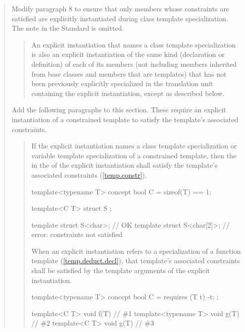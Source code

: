 \begin{quote}
Modify paragraph 8 to ensure that only members whose constraints are 
satisfied are explicitly instantiated during class template 
specialization. The note in the \Cpp Standard is omitted.

\begin{quote}
\setcounter{Paras}{7}
\pnum
An explicit instantiation that names a class template specialization is 
also an explicit instantiation of the same kind (declaration or 
definition) of each of its members (not including members inherited from 
base classes and members that are templates) that has not been previously 
explicitly specialized in the translation unit containing the explicit 
instantiation,  
except as described below.
\end{quote}

Add the following paragraphs to this section. These require an explicit
instantiation of a constrained template to satisfy the template's
associated constraints.

\begin{quote}
\begin{addedblock}
\setcounter{Paras}{13}
\pnum
If the explicit instantiation names a class template specialization
or variable template specialization of a constrained template, then
the  in the
 of the explicit
instantiation shall satisfy the template's associated constraints
(\ref{temp.constr}).
\enterexample
\begin{codeblock}
template<typename T> concept bool C = sizeof(T) == 1;

template<C T> struct S { };

template struct S<char>;    // OK
template struct S<char[2]>; // error: constraints not satisfied
\end{codeblock}
\exitexample

\pnum
When an explicit instantiation refers to a specialization of a
function template (\ref{temp.deduct.decl}), that 
template's associated constraints shall be satisfied by the template 
arguments of the explicit instantiation.

\enterexample
\begin{codeblock}
template<typename T> concept bool C = requires (T t) { -t; };

template<C T>        void f(T) { } // \#1
template<typename T> void g(T) { } // \#2
template<C T>        void g(T) { } // \#3


\end{codeblock}
\end{addedblock}
\end{quote}
\end{quote}

